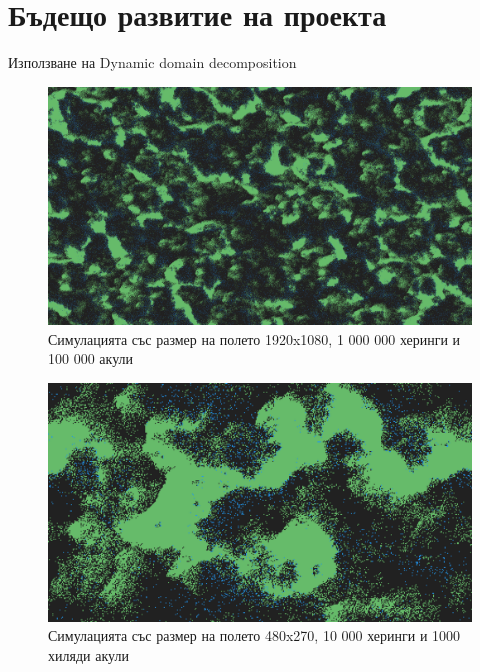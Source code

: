 \documentclass{article}
\begin{document}
\section{Бъдещо развитие на проекта}
Използване на Dynamic domain decomposition

\begin{figure}[H]
	\centering
	\includegraphics[width=1\textwidth]{screenshot-big.png}
	\caption{Симулацията със размер на полето 1920x1080, 1 000 000 херинги и 100 000 акули}
	\label{fig:figure2}
\end{figure}

\begin{figure}[H]
	\centering
	\includegraphics[width=1\textwidth]{screenshot-small.png}
	\caption{Симулацията със размер на полето 480x270, 10 000 херинги и 1000 хиляди акули}
	\label{fig:figure3}
\end{figure}

{}

\end{document}
